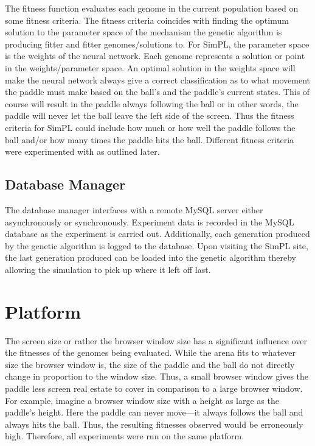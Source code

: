 \documentclass[a4paper,10pt]{article}
\begin{document}
The fitness function evaluates each genome in the current population based on some fitness criteria. The fitness criteria coincides with finding the optimum solution to the parameter space of the mechanism the genetic algorithm is producing fitter and fitter genomes/solutions to. For SimPL, the parameter space is the weights of the neural network. Each genome represents a solution or point in the weights/parameter space. An optimal solution in the weights space will make the neural network always give a correct classification as to what movement the paddle must make based on the ball's and the paddle's current states. This of course will result in the paddle always following the ball or in other words, the paddle will never let the ball leave the left side of the screen. Thus the fitness criteria for SimPL could include how much or how well the paddle follows the ball and/or how many times the paddle hits the ball. Different fitness criteria were experimented with as outlined later. 


\subsection{Database Manager}

The database manager interfaces with a remote MySQL server either asynchronously or synchronously. Experiment data is recorded in the MySQL database as the experiment is carried out. Additionally, each generation produced by the genetic algorithm is logged to the database. Upon visiting the SimPL site, the last generation produced can be loaded into the genetic algorithm thereby allowing the simulation to pick up where it left off last.  

\section{Platform}

The screen size or rather the browser window size has a significant influence over the fitnesses of the genomes being evaluated. While the arena fits to whatever size the browser window is, the size of the paddle and the ball do not directly change in proportion to the window size. Thus, a small browser window gives the paddle less screen real estate to cover in comparison to a large browser window. For example, imagine a browser window size with a height as large as the paddle's height. Here the paddle can never move---it always follows the ball and always hits the ball. Thus, the resulting fitnesses observed would be erroneously high. Therefore, all experiments were run on the same platform. 
\end{document}

